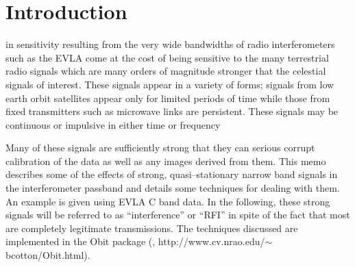 \documentclass[journal]{IEEEtran}
\begin{document}
\section{Introduction}
% 
% 
% 
% 
 in sensitivity resulting from the very
wide bandwidths of radio interferometers such as the EVLA come at the
cost of being sensitive to the many terrestrial radio signals which
are many orders of magnitude stronger that the celestial signals of
interest. 
These signals appear in a variety of forms; signals from low earth
orbit satellites appear only for limited periods of time while
those from fixed transmitters such as microwave links are persistent.
These signals may be continuous or impulsive in either time or frequency

Many of these signals are sufficiently strong that they can serious
corrupt calibration of the data as well as any images derived from
them. 
This memo describes some of the effects of strong, quasi--stationary
narrow band signals in the interferometer passband and details some
techniques for dealing with them.
An example is given using  EVLA C band data.
In the following, these strong signals will be referred to as
``interference'' or ``RFI'' in spite of the fact that most are
completely legitimate transmissions.
The techniques discussed are implemented in the Obit package
(\cite{OBIT}, 
http://www.cv.nrao.edu/$\sim$bcotton/Obit.html).
\end{document}
